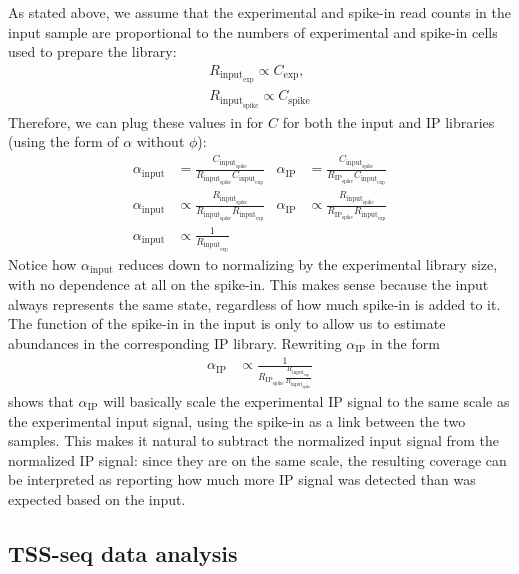 As stated above, we assume that the experimental and spike-in read counts in the input sample are proportional to the numbers of experimental and spike-in cells used to prepare the library:
\begin{align*}
    R_{\text{input}_\text{exp}} \propto C_\text{exp}, \\
    R_{\text{input}_\text{spike}} \propto C_\text{spike}
\end{align*}
Therefore, we can plug these values in for $C$ for both the input and IP libraries (using the form of $\alpha$ without $\phi$):
\begin{align*}
    \alpha_\text{input} &= \frac{C_{\text{input}_\text{spike}}}{R_{\text{input}_\text{spike}} C_{\text{input}_\text{exp}}} &
    \alpha_\text{IP} &= \frac{C_{\text{input}_\text{spike}}}{R_{\text{IP}_\text{spike}} C_{\text{input}_\text{exp}}} \\
    \alpha_\text{input} &\propto \frac{R_{\text{input}_\text{spike}}}{R_{\text{input}_\text{spike}} R_{\text{input}_\text{exp}}} &
    \alpha_\text{IP} &\propto \frac{R_{\text{input}_\text{spike}}}{R_{\text{IP}_\text{spike}} R_{\text{input}_\text{exp}}} \\
    \alpha_\text{input} &\propto \frac{1}{R_{\text{input}_\text{exp}}} &
\end{align*}
Notice how $\alpha_\text{input}$ reduces down to normalizing by the experimental library size, with no dependence at all on the spike-in.
This makes sense because the input always represents the same state, regardless of how much spike-in is added to it.
The function of the spike-in in the input is only to allow us to estimate abundances in the corresponding IP library.
Rewriting $\alpha_\text{IP}$ in the form
\begin{align*}
    \alpha_\text{IP} &\propto \frac{1}{R_{\text{IP}_\text{spike}} \frac{R_{\text{input}_\text{exp}}}{R_{\text{input}_\text{spike}}}}
\end{align*}
shows that $\alpha_\text{IP}$ will basically scale the experimental IP signal to the same scale as the experimental input signal, using the spike-in as a link between the two samples.
This makes it natural to subtract the normalized input signal from the normalized IP signal: since they are on the same scale, the resulting coverage can be interpreted as reporting how much more IP signal was detected than was expected based on the input.

\subsection{TSS-seq data analysis}

